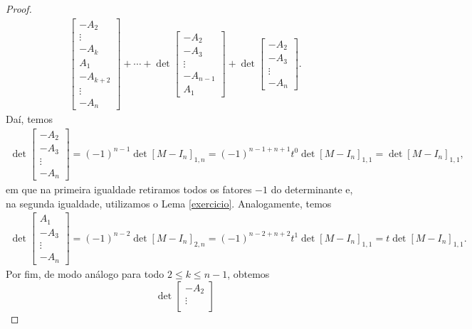 \begin{proof}
\begin{align*}
\begin{bmatrix}
    		-A_2 \\
    		\vdots\\
    		-A_k \\
    		A_1\\
    		-A_{k+2}\\
    		\vdots\\
    		-A_n
    		\end{bmatrix} +\cdots + 
    		\det\begin{bmatrix}
    		-A_2\\
    		-A_3 \\
    		\vdots\\
    		-A_{n-1}\\
    		A_1
    		\end{bmatrix}+\det\begin{bmatrix}
    		-A_2\\
    		-A_3\\
    		\vdots\\
    		-A_n
    		\end{bmatrix}.
		\end{align*}
		Daí, temos
		\begin{align*}
    		\det\begin{bmatrix}
    		-A_2\\
    		-A_3\\
    		\vdots \\
    		-A_n
    		\end{bmatrix} 
    		= (-1)^{n-1}\det[M-I_n]_{1,n} 
    		= (-1)^{n-1+n+1}t^0\det[M - I_n]_{1,1} 
    		= \det[M-I_n]_{1,1},
		\end{align*}
		em que na primeira igualdade retiramos todos os fatores $-1$ do determinante e, na segunda igualdade,
		utilizamos o Lema \ref{exercicio}. Analogamente, temos
		\begin{align*}
    		\det\begin{bmatrix}
    		A_1\\
    		-A_3\\
    		\vdots\\
    		-A_n
    		\end{bmatrix} = (-1)^{n-2}\det[M-I_n]_{2,n} 
    		= (-1)^{n-2+n+2}t^1\det[M - I_n]_{1,1} 
    		= t\det[M - I_n]_{1,1}.
		\end{align*}
		Por fim, de modo análogo para todo $2\leq k\leq n-1$, obtemos
		\begin{equation*}
    		\det\begin{bmatrix}
    		-A_2 \\
    		\vdots\\

\end{bmatrix}
\end{equation*}
\end{proof}
